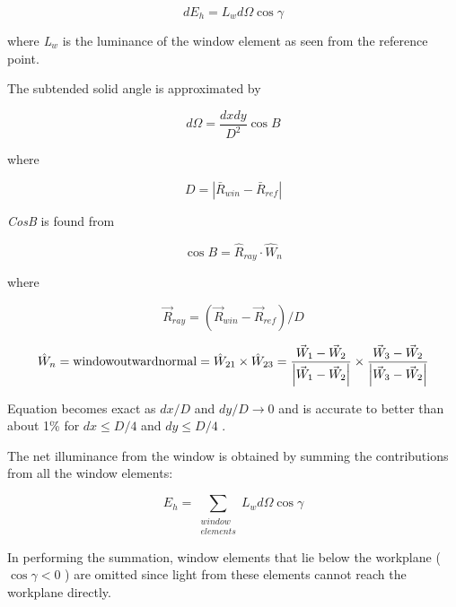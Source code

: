 \begin{equation}
d{E_h} = {L_w}d\Omega \cos \gamma
\end{equation}

where \emph{L\(_{w}\)} is the luminance of the window element as seen from the reference point.

The subtended solid angle is approximated by

\begin{equation}
d\Omega  = \frac{{dxdy}}{{{D^2}}}\cos B
\end{equation}

where

\begin{equation}
D = \left| {{{\bar R}_{win}} - {{\bar R}_{ref}}} \right|
\end{equation}

\emph{CosB} is found from

\begin{equation}
\cos B = {\hat R_{ray}} \cdot {\hat W_n}
\end{equation}

where

\begin{equation}
{\vec R_{ray}} = ({\vec R_{win}} - {\vec R_{ref}})/D
\end{equation}

\begin{equation}
{\hat W_n} = {\rm{ window outward normal }} = {\hat W_{21}} \times {\hat W_{23}} = \frac{{{{\vec W}_1} - {{\vec W}_2}}}{{\left| {{{\vec W}_1} - {{\vec W}_2}} \right|}} \times \frac{{{{\vec W}_3} - {{\vec W}_2}}}{{\left| {{{\vec W}_3} - {{\vec W}_2}} \right|}}
\end{equation}

Equation becomes exact as \(dx/D\) and \(dy/D \to 0\) and is accurate to better than about 1\% for \(dx \le D/4\) and \(dy \le D/4\) .

The net illuminance from the window is obtained by summing the contributions from all the window elements:

\begin{equation}
{E_h} = \sum\limits_{\scriptstyle \substack{window \\ elements}} {{L_w}d\Omega \cos \gamma }
\end{equation}

In performing the summation, window elements that lie below the workplane (\(\cos \gamma < 0\) ) are omitted since light from these elements cannot reach the workplane directly.

